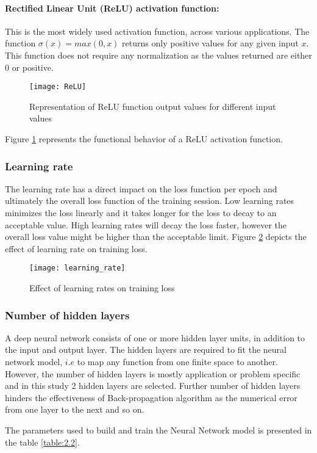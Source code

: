 \paragraph{Rectified Linear Unit (ReLU) activation function:}
This is the most widely used activation function, across various applications. The function $\sigma(x) = max(0,x)$ returns only positive values for any given input $x$. This function does not require any normalization as the values returned are either $0$ or positive.
\begin{figure}[h]
\centering
\texttt{[image: ReLU]}
\caption{Representation of ReLU function output values for different input values}
\label{fig:2.13}
\end{figure}    
Figure \ref{fig:2.13} represents the functional behavior of a ReLU activation function.
\subsubsection{Learning rate}    
The learning rate has a direct impact on the loss function per epoch and ultimately the overall loss function of the training session. Low learning rates minimizes the loss linearly and it takes longer for the loss to decay to an acceptable value. High learning rates will decay the loss faster, however the overall loss value might be higher than the acceptable limit. Figure \ref{fig:2.14} depicts the effect of learning rate on training loss.
\begin{figure}[h]
\centering
\texttt{[image: learning\_rate]}
\caption{Effect of learning rates on training loss}
\label{fig:2.14}
\end{figure}
\subsubsection{Number of hidden layers}
A deep neural network consists of one or more hidden layer units, in addition to the input and output layer. The hidden layers are required to fit the neural network model, $i.e$ to map any function from one finite space to another. However, the number of hidden layers is mostly application or problem specific and in this study 2 hidden layers are selected. Further number of hidden layers hinders the effectiveness of Back-propagation algorithm as the numerical error from one layer to the next and so on.  

The parameters used to build and train the Neural Network model is presented in the table \ref{table:2.2}.

